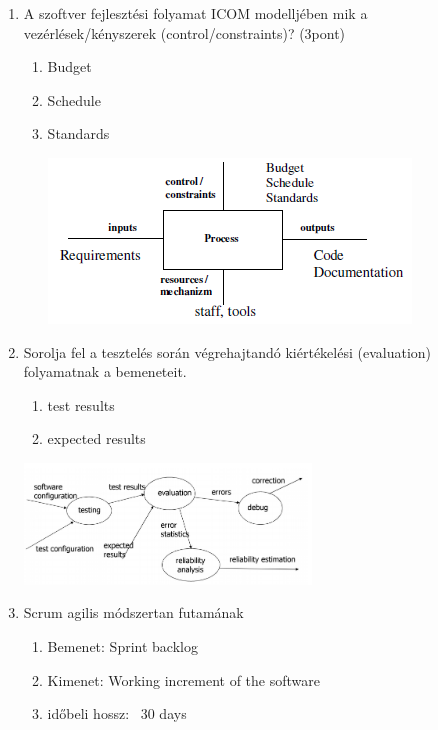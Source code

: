 	\begin{enumerate}

		\item A szoftver fejlesztési folyamat ICOM modelljében mik a vezérlések/kényszerek (control/constraints)? (3pont)

			\begin{enumerate}
				\item Budget
				\item Schedule
				\item Standards

				\begin{center}
					\includegraphics[scale=0.7]{img/icom}
				\end{center}
			\end{enumerate}

		\item Sorolja fel a tesztelés során végrehajtandó kiértékelési (evaluation) folyamatnak a bemeneteit.

			\begin{enumerate}
				\item test results
				\item expected results
			\end{enumerate}
			\begin{center}
			    \includegraphics[width=0.60\textwidth]{img/evaluation}
			 \end{center}

		\item	Scrum agilis módszertan futamának

			\begin{enumerate}
				\item Bemenet: Sprint backlog
				\item Kimenet: Working increment of the software
				\item időbeli hossz: ~30 days
			\end{enumerate}


\end{enumerate}
